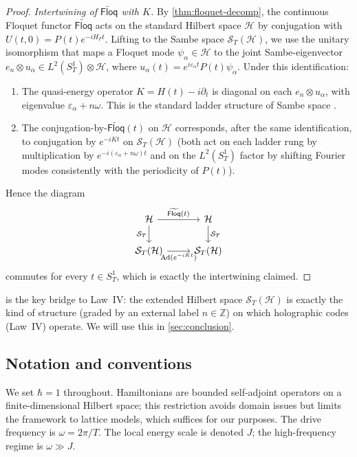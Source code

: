 \documentclass[12pt]{article}
\theoremstyle{definition}
\theoremstyle{remark}
\newcommand{\Hcal}{\mathcal{H}}
\newcommand{\Z}{\mathbb{Z}}
\newcommand{\HF}{H_{F}}
\newcommand{\Floq}{\mathsf{Floq}}
\begin{document}
\begin{proof}
\emph{Intertwining of $\widetilde{\Floq}$ with $K$.} By \cref{thm:floquet-decomp},
the continuous Floquet functor $\widetilde{\Floq}$ acts on the standard
Hilbert space $\Hcal$ by conjugation with $U(t,0)=P(t)e^{-i\HF t}$. Lifting to
the Sambe space $\mathcal{S}_T(\Hcal)$, we use the unitary isomorphism that
maps a Floquet mode $\psi_\alpha\in\Hcal$ to the joint Sambe-eigenvector
$e_n\otimes u_\alpha\in L^2(S^1_T)\otimes\Hcal$, where $u_\alpha(t)=
e^{i\varepsilon_\alpha t}P(t)\psi_\alpha$. Under this identification:
\begin{enumerate}
\item The quasi-energy operator $K = H(t) - i\partial_t$ is diagonal on
each $e_n\otimes u_\alpha$, with eigenvalue $\varepsilon_\alpha + n\omega$.
This is the standard ladder structure of Sambe space \cite{sambe1973}.
\item The conjugation-by-$\widetilde{\Floq}(t)$ on $\Hcal$ corresponds, after
the same identification, to conjugation by $e^{-iKt}$ on $\mathcal{S}_T(\Hcal)$
(both act on each ladder rung by multiplication by
$e^{-i(\varepsilon_\alpha+n\omega)t}$ and on the $L^2(S^1_T)$ factor by
shifting Fourier modes consistently with the periodicity of $P(t)$).
\end{enumerate}
Hence the diagram
\begin{equation*}
\begin{tikzcd}
\Hcal \arrow[r,"\widetilde{\Floq}(t)"]\arrow[d,"\mathcal{S}_T"'] & \Hcal \arrow[d,"\mathcal{S}_T"]\\
\mathcal{S}_T(\Hcal) \arrow[r,"\mathrm{Ad}(e^{-iKt})"'] & \mathcal{S}_T(\Hcal)
\end{tikzcd}
\end{equation*}
commutes for every $t\in S^1_T$, which is exactly the intertwining claimed.
\end{proof}

 is the key bridge to Law~IV: the extended Hilbert space $\mathcal{S}_T(\Hcal)$ is exactly the kind of structure (graded by an external label $n\in\Z$) on which holographic codes (Law~IV) operate. We will use this in \cref{sec:conclusion}.

\subsection{Notation and conventions}

We set $\hbar=1$ throughout. Hamiltonians are bounded self-adjoint operators on a finite-dimensional Hilbert space; this restriction avoids domain issues but limits the framework to lattice models, which suffices for our purposes. The drive frequency is $\omega=2\pi/T$. The local energy scale is denoted $J$; the high-frequency regime is $\omega\gg J$.
\end{document}
